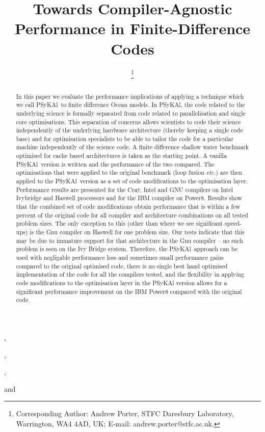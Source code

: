 \documentclass{IOS-Book-Article}
\newcommand{\psykal}{{PS}y{KA}l}
\begin{document}
\pagestyle{headings}
\def\thepage{}

\begin{frontmatter}              %
%
\title{Towards Compiler-Agnostic Performance in Finite-Difference Codes}

\author[A]{ %
\thanks{Corresponding Author: Andrew Porter, STFC Daresbury Laboratory, Warrington, WA4 4AD, UK; E-mail:
andrew.porter@stfc.ac.uk.}},
\author[A]{ },
\author[A]{ },
\author[B]{ }
and
\author[C]{ }
\address[A]{STFC Daresbury Laboratory, Warrington, WA4 4AD, UK}
\address[B]{The University of Manchester, UK}
\address[C]{STFC Hartree Centre}

\begin{abstract}
In this paper we evaluate the performance implications of applying a
technique which we call \psykal\ to finite difference Ocean models. 
%
In \psykal, the code related to the underlying science is formally
separated from code related to parallelisation and single core
optimisations. This separation of concerns allows scientists to code
their science independently of the underlying hardware architecture
(thereby keeping a single code base) and for optimisation specialists
to be able to tailor the code for a particular machine independently
of the science code.
%
A finite difference shallow water benchmark optimised for cache based
architectures is taken as the starting point. A vanilla \psykal\ version
is written and the performance of the two compared. The optimisations
that were applied to the original benchmark (loop fusion {\it etc.}) are then
applied to the \psykal\ version as a set of code modifications to the
optimisation layer. Performance results are presented for the Cray,
Intel and GNU compilers on Intel Ivybridge and Haswell processors and
for the IBM compiler on Power8.
%
Results show that the combined set of code modifications obtain
performance that is within a few percent of the original code for all
compiler and architecture combinations on all tested problem
sizes. The only exception to this (other than where we see significant
speed-ups) is the Gnu compiler on Haswell for one problem size. Our
tests indicate that this may be due to immature support for that
architecture in the Gnu compiler -- no such problem is seen on the Ivy
Bridge system.
Therefore, the \psykal\ approach can be used with negligable
performance loss and sometimes small performance gains compared to the
original optimised code, there is no single best hand optimised
implementation of the code for all the compilers tested, and the
flexibility in applying code modifications to the optimisation layer
in the PSyKAl version allows for a significant performance improvement
on the IBM Power8 compared with the original code.


\end{abstract}
\end{frontmatter}
\end{document}

